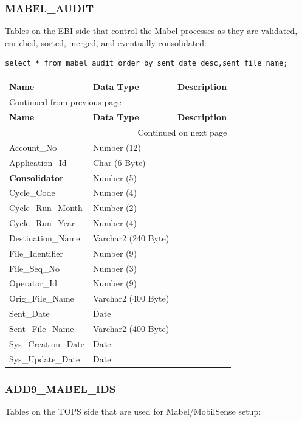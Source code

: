 \documentclass[12pt,twoside]{article}
\begin{document}
\normalsize

\subsubsection{MABEL\_AUDIT}
\label{sec:orgheadline146}
Tables on the EBI side that control the Mabel processes as they are validated, enriched, sorted, merged, and eventually consolidated:
\begin{verbatim}
select * from mabel_audit order by sent_date desc,sent_file_name;
\end{verbatim}

\footnotesize
\begin{longtable}{l|l|l}
\hline
\textbf{Name} & \textbf{Data Type} & \textbf{Description}\\
\hline
\endfirsthead
\multicolumn{3}{l}{Continued from previous page} \\
\hline

\textbf{Name} & \textbf{Data Type} & \textbf{Description} \\

\hline
\endhead
\hline\multicolumn{3}{r}{Continued on next page} \\
\endfoot
\endlastfoot
\hline
Account\_No & Number (12) & \\
Application\_Id & Char (6 Byte) & \\
\textbf{Consolidator} & Number (5) & \\
Cycle\_Code & Number (4) & \\
Cycle\_Run\_Month & Number (2) & \\
Cycle\_Run\_Year & Number (4) & \\
Destination\_Name & Varchar2 (240 Byte) & \\
File\_Identifier & Number (9) & \\
File\_Seq\_No & Number (3) & \\
Operator\_Id & Number (9) & \\
Orig\_File\_Name & Varchar2 (400 Byte) & \\
Sent\_Date & Date & \\
Sent\_File\_Name & Varchar2 (400 Byte) & \\
Sys\_Creation\_Date & Date & \\
Sys\_Update\_Date & Date & \\
\hline
\end{longtable}

\normalsize

\subsubsection{ADD9\_MABEL\_IDS}
\label{sec:orgheadline147}
Tables on the TOPS side that are used for Mabel/MobilSense setup:
\footnotesize
\end{document}
